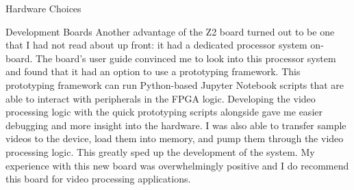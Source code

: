 \documentclass{matthijs}
\begin{document}
\begin{hoofdstuk}{Hardware Choices}
\begin{paragraaf}{Development Boards}
			Another advantage of the Z2 board turned out to be one that I had not read about up front: it had a dedicated processor system on-board.
			The board's user guide convinced me to look into this processor system and found that it had an option to use a prototyping framework.
			This prototyping framework can run Python-based Jupyter Notebook scripts that are able to interact with peripherals in the FPGA logic.
			Developing the video processing logic with the quick prototyping scripts alongside gave me easier debugging and more insight into the hardware.
			I was also able to transfer sample videos to the device, load them into memory, and pump them through the video processing logic.
			This greatly sped up the development of the system.
			My experience with this new board was overwhelmingly positive and I do recommend this board for video processing applications.

		\end{paragraaf}

	\end{hoofdstuk}
\end{document}
